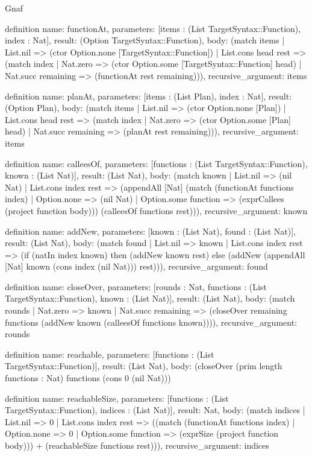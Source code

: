 \begin{lexlean}{Gnaf}
\begin{semanticmodule}
definition{
  name: functionAt,
  parameters: [items : (List TargetSyntax::Function), index : Nat],
  result: (Option TargetSyntax::Function),
  body: (match items
    | List.nil => (ctor Option.none [TargetSyntax::Function])
    | List.cons head rest => (match index
      | Nat.zero => (ctor Option.some [TargetSyntax::Function] head)
      | Nat.succ remaining => (functionAt rest remaining))),
  recursive_argument: items
}

definition{
  name: planAt,
  parameters: [items : (List Plan), index : Nat],
  result: (Option Plan),
  body: (match items
    | List.nil => (ctor Option.none [Plan])
    | List.cons head rest => (match index
      | Nat.zero => (ctor Option.some [Plan] head)
      | Nat.succ remaining => (planAt rest remaining))),
  recursive_argument: items
}

definition{
  name: calleesOf,
  parameters: [functions : (List TargetSyntax::Function), known : (List Nat)],
  result: (List Nat),
  body: (match known
    | List.nil => (nil Nat)
    | List.cons index rest => (appendAll [Nat] (match (functionAt functions index)
      | Option.none => (nil Nat)
      | Option.some function => (exprCallees (project function body))) (calleesOf functions rest))),
  recursive_argument: known
}

definition{
  name: addNew,
  parameters: [known : (List Nat), found : (List Nat)],
  result: (List Nat),
  body: (match found
    | List.nil => known
    | List.cons index rest => (if (natIn index known) then (addNew known rest) else (addNew (appendAll [Nat] known (cons index (nil Nat))) rest))),
  recursive_argument: found
}

definition{
  name: closeOver,
  parameters: [rounds : Nat, functions : (List TargetSyntax::Function), known : (List Nat)],
  result: (List Nat),
  body: (match rounds
    | Nat.zero => known
    | Nat.succ remaining => (closeOver remaining functions (addNew known (calleesOf functions known)))),
  recursive_argument: rounds
}

definition{
  name: reachable,
  parameters: [functions : (List TargetSyntax::Function)],
  result: (List Nat),
  body: (closeOver (prim length functions : Nat) functions (cons 0 (nil Nat)))
}

definition{
  name: reachableSize,
  parameters: [functions : (List TargetSyntax::Function), indices : (List Nat)],
  result: Nat,
  body: (match indices
    | List.nil => 0
    | List.cons index rest => ((match (functionAt functions index)
      | Option.none => 0
      | Option.some function => (exprSize (project function body))) + (reachableSize functions rest))),
  recursive_argument: indices
}


\end{semanticmodule}
\end{lexlean}
